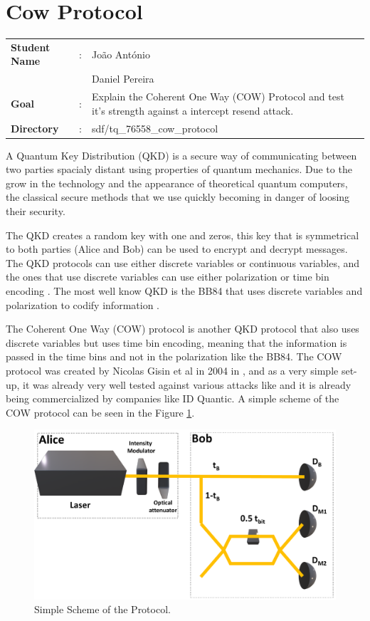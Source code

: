 \clearpage
\section{Cow Protocol}

\begin{refsection}

\begin{tcolorbox}	
\begin{tabular}{p{2.75cm} p{0.2cm} p{10.5cm}} 	
\textbf{Student Name}  &:&  Jo\~ao Ant\'onio\\
\textbf{}  & &  Daniel Pereira\\
\textbf{Goal}          &:& Explain the Coherent One Way (COW) Protocol and test it's strength against a intercept resend attack.\\
\textbf{Directory}              &:& sdf/tq_76558_cow_protocol
\end{tabular}
\end{tcolorbox}

A Quantum Key Distribution (QKD) is a secure way of communicating between two parties spacialy distant using properties of quantum mechanics. Due to the grow in the technology and the appearance of theoretical quantum computers, the classical secure methods that we use quickly becoming in danger of loosing their security.

The QKD creates a random key with one and zeros, this key that is symmetrical to both parties (Alice and Bob) can be used to encrypt and decrypt messages. The QKD protocols can use either discrete variables or continuous variables, and the ones that use discrete variables can use either polarization or time bin encoding \cite{singh}. The most well know QKD is the BB84 that uses discrete variables and polarization to codify information \cite{bennett1992quantum}.

The Coherent One Way (COW) protocol is another QKD protocol that also uses discrete variables but uses time bin encoding, meaning that the information is passed in the time bins and not in the polarization like the BB84. The COW protocol was created by Nicolas Gisin et al in 2004 in \cite{gisin2004towards}, and as a very simple set-up, it was already very well tested against various attacks like \cite{branciard2006zero} and it is already being commercialized by companies like ID Quantic. A simple scheme of the COW protocol can be seen in the Figure \ref{fig:Scheme}.

\begin{figure}[h]
\centering
\includegraphics[width=.4\linewidth]{./sdf/tq_76558_cow_protocol/slides/figures/Full2.pdf}
\caption{Simple Scheme of the Protocol.}
\label{fig:Scheme}
\end{figure}


\end{refsection}

